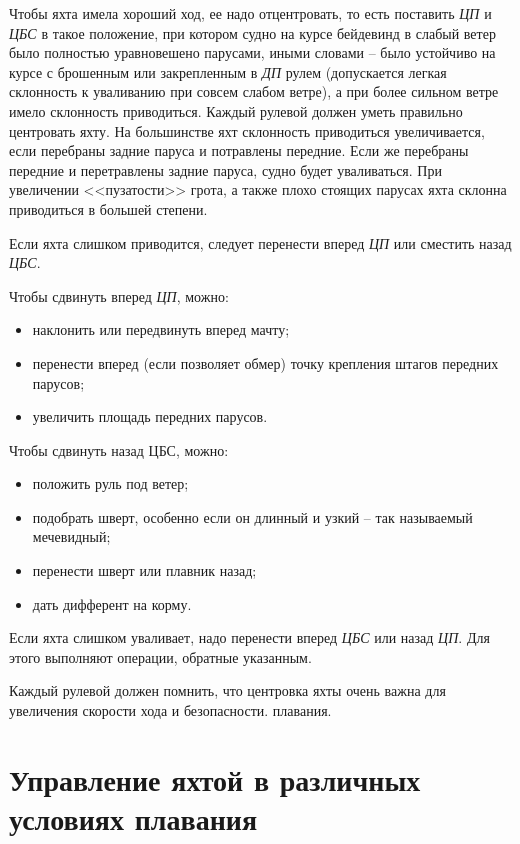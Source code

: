 \documentclass[a4paper, 12pt, twoside, final]{scrbook}
\begin{document}
Чтобы яхта имела хороший ход, ее надо отцентровать, то есть поставить \textit{ЦП} и \textit{ЦБС} в такое положение, при котором судно на курсе бейдевинд в слабый ветер было полностью уравновешено парусами, иными словами \--- было устойчиво на курсе с брошенным или закрепленным в \textit{ДП} рулем (допускается легкая склонность к уваливанию при совсем слабом ветре), а при более сильном ветре имело склонность приводиться. Каждый рулевой должен уметь правильно центровать яхту. На большинстве яхт склонность приводиться увеличивается, если перебраны задние паруса и потравлены передние. Если же перебраны передние и перетравлены задние паруса, судно будет уваливаться. При увеличении <<пузатости>> грота, а также плохо стоящих парусах яхта склонна приводиться в большей степени.

Если яхта слишком приводится, следует перенести вперед \textit{ЦП} или сместить назад \textit{ЦБС}.

Чтобы сдвинуть вперед \textit{ЦП}, можно:

\begin{itemize}
\item наклонить или передвинуть вперед мачту;
\item перенести вперед (если позволяет обмер) точку крепления штагов передних парусов;
\item увеличить площадь передних парусов.
\end{itemize}

Чтобы сдвинуть назад ЦБС, можно:

\begin{itemize}
\item положить руль под ветер;
\item подобрать шверт, особенно если он длинный и узкий \--- так называемый мечевидный;
\item перенести шверт или плавник назад;
\item дать дифферент на корму.
\end{itemize}

Если яхта слишком уваливает, надо перенести вперед \textit{ЦБС} или назад \textit{ЦП}. Для этого выполняют операции, обратные указанным.

Каждый рулевой должен помнить, что центровка яхты очень важна для увеличения скорости хода и безопасности. плавания.

\chapter{Управление яхтой в различных условиях плавания}
\end{document}
